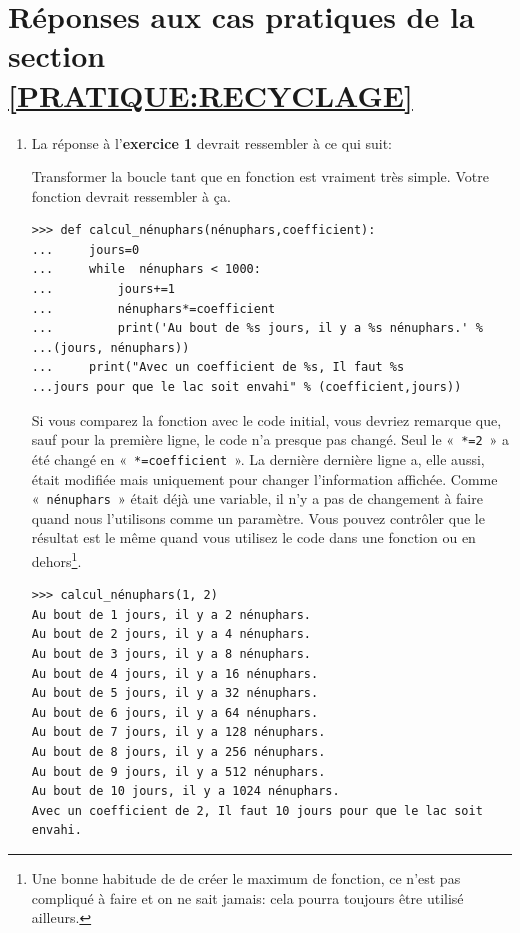 \section{Réponses aux cas pratiques de la section  \ref{PRATIQUE:RECYCLAGE}\label{REPONSES:RECYCLAGE}}
\begin{enumerate}
\item La réponse à l'\textbf{exercice 1} devrait ressembler à ce qui suit: 

Transformer la boucle tant que en fonction est vraiment très simple. Votre fonction devrait ressembler à ça.

\begin{Verbatim}[frame=single,rulecolor=\color{mbleu}, label=à taper]
>>> def calcul_nénuphars(nénuphars,coefficient):
...     jours=0
...     while  nénuphars < 1000:
...         jours+=1
...         nénuphars*=coefficient
...         print('Au bout de %s jours, il y a %s nénuphars.' % 
...(jours, nénuphars))
...     print("Avec un coefficient de %s, Il faut %s 
...jours pour que le lac soit envahi" % (coefficient,jours))
\end{Verbatim}

Si vous comparez la fonction avec le code initial, vous devriez remarque que, sauf pour la première ligne, le code n'a presque pas changé. Seul le « \texttt{*=2} » a été changé en « \texttt{*=coefficient} ». La dernière dernière ligne a, elle aussi, était modifiée mais uniquement pour changer l'information affichée. Comme « \texttt{nénuphars} » était déjà une variable, il n'y a pas de changement à faire quand nous l'utilisons comme un paramètre. Vous pouvez contrôler que le résultat est le même quand vous utilisez le code dans une fonction ou en dehors\footnote{Une bonne habitude de de créer le maximum de fonction, ce n'est pas compliqué à faire et on ne sait jamais: cela pourra toujours être utilisé ailleurs.}.

\begin{Verbatim}[frame=single,rulecolor=\color{mbleu}, label=à taper]
>>> calcul_nénuphars(1, 2)
Au bout de 1 jours, il y a 2 nénuphars.
Au bout de 2 jours, il y a 4 nénuphars.
Au bout de 3 jours, il y a 8 nénuphars.
Au bout de 4 jours, il y a 16 nénuphars.
Au bout de 5 jours, il y a 32 nénuphars.
Au bout de 6 jours, il y a 64 nénuphars.
Au bout de 7 jours, il y a 128 nénuphars.
Au bout de 8 jours, il y a 256 nénuphars.
Au bout de 9 jours, il y a 512 nénuphars.
Au bout de 10 jours, il y a 1024 nénuphars.
Avec un coefficient de 2, Il faut 10 jours pour que le lac soit 
envahi.
\end{Verbatim}


\end{enumerate}
